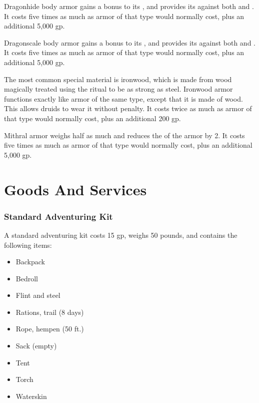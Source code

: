          Dragonhide body armor gains a  bonus to its , and provides its  against both  and .
        It costs five times as much as armor of that type would normally cost, plus an additional 5,000 gp.

         Dragonscale body armor gains a  bonus to its , and provides its  against both  and .
        It costs five times as much as armor of that type would normally cost, plus an additional 5,000 gp.

         The most common special material is ironwood, which is made from wood magically treated using the  ritual to be as strong as steel. Ironwood armor functions exactly like  armor of the same type, except that it is made of wood. This allows druids to wear it without penalty.
        It costs twice as much as armor of that type would normally cost, plus an additional 200 gp.

         Mithral armor weighs half as much and reduces the  of the armor by 2.
        It costs five times as much as armor of that type would normally cost, plus an additional 5,000 gp.

\section{Goods And Services}

    \subsubsection{Standard Adventuring Kit}
        A standard adventuring kit costs 15 gp, weighs 50 pounds, and contains the following items:
        \begin{itemize}
            \item Backpack
            \item Bedroll
            \item Flint and steel
            \item Rations, trail (8 days)
            \item Rope, hempen (50 ft.)
            \item Sack (empty)
            \item Tent
            \item Torch
            \item Waterskin
        \end{itemize}

